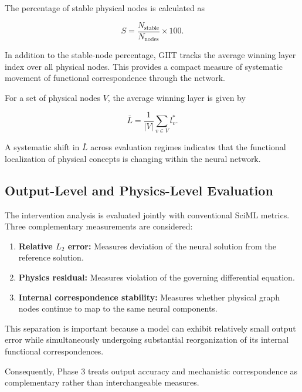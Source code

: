 \documentclass[12pt,singleside,a4paper]{article}
\begin{document}
The percentage of stable physical nodes is calculated as

\begin{equation}
    S =
    \frac{N_{\mathrm{stable}}}
    {N_{\mathrm{nodes}}}
    \times 100.
\end{equation}

In addition to the stable-node percentage, GIIT tracks the average
winning layer index over all physical nodes. This provides a compact
measure of systematic movement of functional correspondence through
the network.

For a set of physical nodes $V$, the average winning layer is given by

\begin{equation}
    \bar{L}
    =
    \frac{1}{|V|}
    \sum_{v \in V} l_v^*.
\end{equation}

A systematic shift in $\bar{L}$ across evaluation regimes indicates
that the functional localization of physical concepts is changing
within the neural network.


\subsection{Output-Level and Physics-Level Evaluation}

The intervention analysis is evaluated jointly with conventional
SciML metrics. Three complementary measurements are considered:

\begin{enumerate}
    \item \textbf{Relative $L_2$ error:} Measures deviation of the
    neural solution from the reference solution.
    
    \item \textbf{Physics residual:} Measures violation of the
    governing differential equation.
    
    \item \textbf{Internal correspondence stability:} Measures whether
    physical graph nodes continue to map to the same neural components.
\end{enumerate}

This separation is important because a model can exhibit relatively
small output error while simultaneously undergoing substantial
reorganization of its internal functional correspondences.

Consequently, Phase 3 treats output accuracy and mechanistic
correspondence as complementary rather than interchangeable measures.
\end{document}
